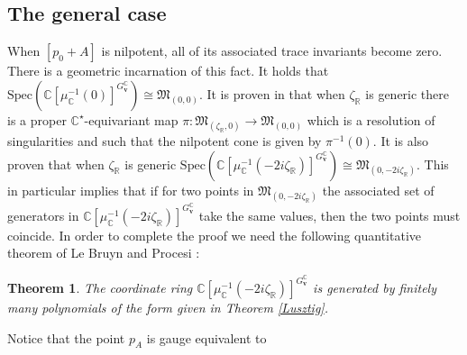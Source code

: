 \documentclass[12pt,oneside,reqno]{amsart}
\newtheorem{theorem}{Theorem}
\theoremstyle{definition}
\numberwithin{equation}{section}
\numberwithin{theorem}{section}
\newcommand{\R}{\mathbb{R}}
\newcommand{\C}{\mathbb{C}}
\begin{document}
\subsection{The general case}
When $[p_0+A]$ is nilpotent, all of its associated trace invariants become zero. There is a geometric incarnation of this fact. It holds that $\mathrm{Spec}(\C[\mu_{\C}^{-1}(0)]^{G_{\mathbf{v}}^{\C}}) \cong \mathfrak M_{(0,0)}$. It is proven in \cite{Na1994} that when $\zeta_{\R}$ is generic there is a proper $\C^{\star}$-equivariant map  $\pi:\mathfrak M_{(\zeta_{\R},0)}\to \mathfrak M_{(0,0)}$ which is a resolution of singularities and such that the nilpotent cone is given by $\pi^{-1}(0)$. It is also proven that when $\zeta_{\R}$ is generic $\mathrm{Spec}(\C[\mu_{\C}^{-1}(-2i\zeta_{\R})]^{G_{\mathbf{v}}^{\C}}) \cong \mathfrak M_{(0,-2i\zeta_{\R})}$. This in particular implies that if for two points in $\mathfrak M_{(0,-2i\zeta_{\R})}$ the associated set of generators in $\C[\mu_{\C}^{-1}(-2i\zeta_{\R})]^{G_{\mathbf{v}}^{\C}}$ take the same values, then the two points must coincide. In order to complete the proof we need the following quantitative theorem of Le Bruyn and Procesi \cite{LP1990}:
%
\begin{theorem}
The coordinate ring $\C[\mu_{\C}^{-1}(-2i\zeta_{\R})]^{G_{\mathbf{v}}^{\C}}$ is generated by finitely many polynomials of the form given in Theorem \ref{Lusztig}. 
\end{theorem}
%
Notice that the point $p_A$ is gauge equivalent to 
\end{document}
